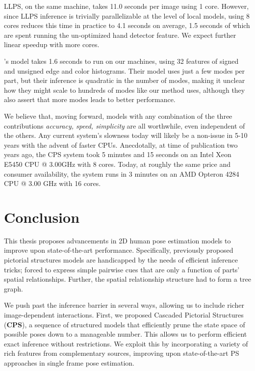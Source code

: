 LLPS, on the same machine, takes 11.0 seconds per image using 1 core.  However, 
since LLPS inference is trivially parallelizable at the level of local models, 
using 8 cores reduces this time in practice to 4.1 seconds on average, 1.5 
seconds of which are spent running the un-optimized hand detector feature.  We 
expect further linear speedup with more cores.


\citet{deva2011}'s model takes 1.6 seconds to run on our machines, using 32 
features of signed and unsigned edge and color histograms.  Their model uses 
just a few modes per part, but their inference is quadratic in the number of 
modes, making it unclear how they might scale to hundreds of modes like our 
method uses, although they also assert that more modes leads to better 
performance.

We believe that, moving forward, models with any combination of the three 
contributions {\em accuracy, speed, simplicity} are all worthwhile, even 
independent of the others.  Any current system's slowness today will likely be 
a non-issue in 5-10 years with the advent of faster CPUs. Anecdotally, at time 
of publication two years ago, the CPS system took 5 minutes and 15 seconds on 
an Intel Xeon E5450 CPU @ 3.00GHz with 8 cores.  Today, at roughly the same 
price and consumer availability, the system runs in 3 minutes on an AMD Opteron 
4284 CPU @ 3.00 GHz with 16 cores.

\chapter{Conclusion}

This thesis proposes advancements in 2D human pose estimation models to improve 
upon state-of-the-art performance.  Specifically, previously proposed pictorial 
structures models are handicapped by the needs of efficient inference tricks; 
forced to express simple pairwise cues that are only a function of parts' 
spatial relationships.  Further, the spatial relationship structure had to form 
a tree graph.

We push past the inference barrier in several ways, allowing us to include 
richer image-dependent interactions.  First, we proposed Cascaded Pictorial 
Structures ({\bf CPS}), a sequence of structured models that efficiently prune 
the state space of possible poses down to a manageable number.  This allows us 
to perform efficient exact inference without restrictions.  We exploit this by 
incorporating a variety of rich features from complementary sources, improving 
upon state-of-the-art PS approaches in single frame pose estimation.


